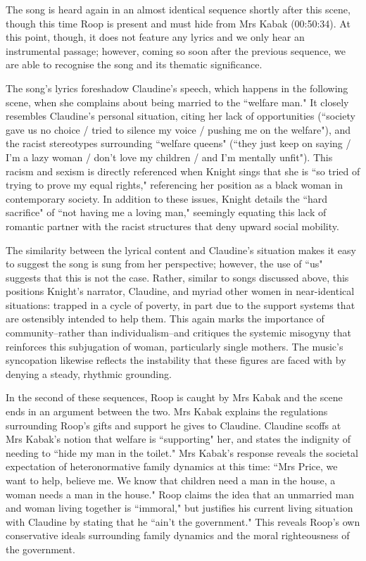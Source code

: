 The song is heard again in an almost identical sequence shortly after this scene, though this time Roop is present and must hide from Mrs Kabak (00:50:34).
At this point, though, it does not feature any lyrics and we only hear an instrumental passage; however, coming so soon after the previous sequence, we are able to recognise the song and its thematic significance.

The song's lyrics foreshadow Claudine's speech, which happens in the following scene, when she complains about being married to the ``welfare man."
It closely resembles Claudine's personal situation, citing her lack of opportunities (``society gave us no choice / tried to silence my voice / pushing me on the welfare"), and the racist stereotypes surrounding ``welfare queens" (``they just keep on saying / I'm a lazy woman / don't love my children / and I'm mentally unfit").
This racism and sexism is directly referenced when Knight sings that she is ``so tried of trying to prove my equal rights," referencing her position as a black woman in contemporary society.
In addition to these issues, Knight details the ``hard sacrifice" of ``not having me a loving man," seemingly equating this lack of romantic partner with the racist structures that deny upward social mobility.

The similarity between the lyrical content and Claudine's situation makes it easy to suggest the song is sung from her perspective; however, the use of ``us" suggests that this is not the case.
Rather, similar to songs discussed above, this positions Knight's narrator, Claudine, and myriad other women in near-identical situations: trapped in a cycle of poverty, in part due to the support systems that are ostensibly intended to help them.
This again marks the importance of community–rather than individualism–and critiques the systemic misogyny that reinforces this subjugation of woman, particularly single mothers.
The music's syncopation likewise reflects the instability that these figures are faced with by denying a steady, rhythmic grounding.

In the second of these sequences, Roop is caught by Mrs Kabak and the scene ends in an argument between the two.
Mrs Kabak explains the regulations surrounding Roop's gifts and support he gives to Claudine.
Claudine scoffs at Mrs Kabak's notion that welfare is ``supporting" her, and states the indignity of needing to ``hide my man in the toilet."
Mrs Kabak's response reveals the societal expectation of heteronormative family dynamics at this time:
``Mrs Price, we want to help, believe me. We know that children need a man in the house, a woman needs a man in the house."
Roop claims the idea that an unmarried man and woman living together is ``immoral," but justifies his current living situation with Claudine by stating that he ``ain't the government."
This reveals Roop's own conservative ideals surrounding family dynamics and the moral righteousness of the government.

